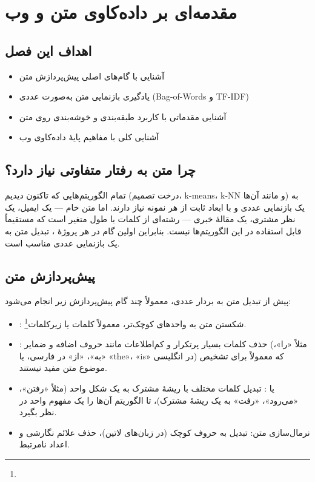 \chapter{مقدمه‌ای بر داده‌کاوی متن و وب}
\label{ch:text-web}

\section*{اهداف این فصل}
\begin{itemize}
    \item آشنایی با گام‌های اصلی پیش‌پردازش متن
    \item یادگیری بازنمایی متن به‌صورت عددی (Bag-of-Words و TF-IDF)
    \item آشنایی مقدماتی با کاربرد طبقه‌بندی و خوشه‌بندی روی متن
    \item آشنایی کلی با مفاهیم پایهٔ داده‌کاوی وب
\end{itemize}

\section{چرا متن به رفتار متفاوتی نیاز دارد؟}

تمام الگوریتم‌هایی که تاکنون دیدیم (درخت تصمیم، k-means، k-NN و
مانند آن‌ها) به یک بازنمایی عددی و با ابعاد ثابت از هر نمونه نیاز
دارند. اما متن خام — یک ایمیل، یک نظر مشتری، یک مقالهٔ خبری — رشته‌ای
از کلمات با طول متغیر است که مستقیماً قابل استفاده در این الگوریتم‌ها
نیست. بنابراین اولین گام در هر پروژهٔ
، تبدیل متن به یک بازنمایی
عددی مناسب است.

\section{پیش‌پردازش متن}

پیش از تبدیل متن به بردار عددی، معمولاً چند گام پیش‌پردازش زیر انجام
می‌شود:

\begin{itemize}
    \item {}: شکستن متن به
          واحدهای کوچک‌تر، معمولاً کلمات یا زیرکلمات\footnote{}.
    \item {}: حذف
          کلمات بسیار پرتکرار و کم‌اطلاعات مانند حروف اضافه و ضمایر
          (مثلاً «را»، «به»، «از» در فارسی، یا «the»، «is» در انگلیسی)
          که معمولاً برای تشخیص موضوع متن مفید نیستند.
    \item {} یا
          : تبدیل کلمات
          مختلف با ریشهٔ مشترک به یک شکل واحد (مثلاً «رفتن»، «می‌رود»،
          «رفت» به یک ریشهٔ مشترک)، تا الگوریتم آن‌ها را یک مفهوم واحد
          در نظر بگیرد.
    \item نرمال‌سازی متن: تبدیل به حروف کوچک (در زبان‌های لاتین)، حذف
          علائم نگارشی و اعداد نامرتبط.
\end{itemize}

